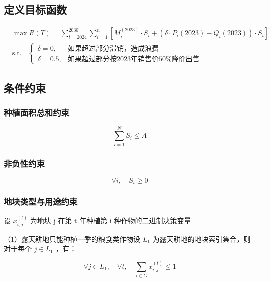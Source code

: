 \documentclass[12pt]{ctexart}
\begin{document}
	\subsection{定义目标函数}
	\begin{equation}  
		\begin{aligned}  
			& \max R(T) = \sum_{t=2024}^{2030} \sum_{i=1}^n \left[ M_i^{(2023)} \cdot S_i + \left( \delta \cdot P_i(2023) - Q_i(2023) \right) \cdot S_i \right] \\  
			& \text{s.t.} \quad  
			\begin{cases}  
				\delta = 0, & \text{如果超过部分滞销，造成浪费} \\  
				\delta = 0.5, & \text{如果超过部分按2023年销售价50\%降价出售}  
			\end{cases}  
		\end{aligned}  
	\end{equation}  
	
	
	\subsection{条件约束}
	\subsubsection{种植面积总和约束}
	\begin{equation}
		\sum_{i=1}^N S_i \leq A
	\end{equation}

	\subsubsection{非负性约束}
	\begin{equation}\forall i, \quad S_i \geq 0\end{equation}
	
	\subsubsection{地块类型与用途约束}
	\setlength{\parindent}{2em}
	设 $x_{i, j}^{(t)}$ 为地块 j 在第 t 年种植第 i 种作物的二进制决策变量
	
	（1）露天耕地只能种植一季的粮食类作物设 $L_1$ 为露天耕地的地块索引集合，则对于每个 $j \in L_1$ ，有：
	
	\begin{equation}
	\forall j \in L_1, \quad \forall t, \quad \sum_{i \in G} x_{i, j}^{(t)} \leq 1
	\end{equation}
	
\end{document}
